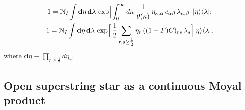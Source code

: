 \documentclass[a4paper,12pt]{article}
\newcommand{\Nc}{\mathcal{N}}
\begin{document}
\begin{subequations}
\begin{gather}
1=\Nc_{I}\int
\mathbf{d}\eta\,\mathbf{d}\lambda\,
\exp\Bigl[
\int_{0}^{\infty}d\kappa\;
\frac{1}{\theta(\kappa)}\, \eta_{\kappa,\alpha}\,c_{\alpha\beta}\,
\lambda_{\kappa,\beta}\Bigr]
|\eta\rangle\langle \lambda|;\\
1=\Nc_{I}\int
\mathbf{d}\eta\,\mathbf{d}\lambda\,
\exp\Bigr[
\,\frac12\sum_{r,s\geq\tfrac12}\eta_{r}\,((1-F)C)_{rs}\,\lambda_s\Bigl]
|\eta\rangle\langle \lambda|,
\end{gather}
\label{edinitsa}
\end{subequations}
where
$\mathbf{d}\eta\equiv\prod_{r\geq\tfrac12}
d\eta_{r}$.



\subsection{Open superstring star as a continuous Moyal product}
\end{document}
